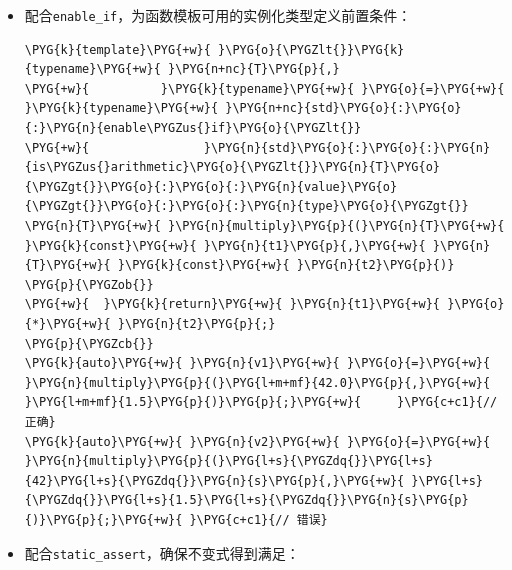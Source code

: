 \begin{itemize}
\item 配合\texttt{enable\_\allowbreak{}if}，为函数模板可用的实例化类型定义前置条件：



\begin{codeblockbg}
\begin{Verbatim}[commandchars=\\\{\},breaklines=true,breakanywhere=true,fontsize=\codefont,xleftmargin=17bp]
\PYG{k}{template}\PYG{+w}{ }\PYG{o}{\PYGZlt{}}\PYG{k}{typename}\PYG{+w}{ }\PYG{n+nc}{T}\PYG{p}{,}
\PYG{+w}{          }\PYG{k}{typename}\PYG{+w}{ }\PYG{o}{=}\PYG{+w}{ }\PYG{k}{typename}\PYG{+w}{ }\PYG{n+nc}{std}\PYG{o}{:}\PYG{o}{:}\PYG{n}{enable\PYGZus{}if}\PYG{o}{\PYGZlt{}}
\PYG{+w}{                }\PYG{n}{std}\PYG{o}{:}\PYG{o}{:}\PYG{n}{is\PYGZus{}arithmetic}\PYG{o}{\PYGZlt{}}\PYG{n}{T}\PYG{o}{\PYGZgt{}}\PYG{o}{:}\PYG{o}{:}\PYG{n}{value}\PYG{o}{\PYGZgt{}}\PYG{o}{:}\PYG{o}{:}\PYG{n}{type}\PYG{o}{\PYGZgt{}}
\PYG{n}{T}\PYG{+w}{ }\PYG{n}{multiply}\PYG{p}{(}\PYG{n}{T}\PYG{+w}{ }\PYG{k}{const}\PYG{+w}{ }\PYG{n}{t1}\PYG{p}{,}\PYG{+w}{ }\PYG{n}{T}\PYG{+w}{ }\PYG{k}{const}\PYG{+w}{ }\PYG{n}{t2}\PYG{p}{)}
\PYG{p}{\PYGZob{}}
\PYG{+w}{  }\PYG{k}{return}\PYG{+w}{ }\PYG{n}{t1}\PYG{+w}{ }\PYG{o}{*}\PYG{+w}{ }\PYG{n}{t2}\PYG{p}{;}
\PYG{p}{\PYGZcb{}}
\PYG{k}{auto}\PYG{+w}{ }\PYG{n}{v1}\PYG{+w}{ }\PYG{o}{=}\PYG{+w}{ }\PYG{n}{multiply}\PYG{p}{(}\PYG{l+m+mf}{42.0}\PYG{p}{,}\PYG{+w}{ }\PYG{l+m+mf}{1.5}\PYG{p}{)}\PYG{p}{;}\PYG{+w}{     }\PYG{c+c1}{// 正确}
\PYG{k}{auto}\PYG{+w}{ }\PYG{n}{v2}\PYG{+w}{ }\PYG{o}{=}\PYG{+w}{ }\PYG{n}{multiply}\PYG{p}{(}\PYG{l+s}{\PYGZdq{}}\PYG{l+s}{42}\PYG{l+s}{\PYGZdq{}}\PYG{n}{s}\PYG{p}{,}\PYG{+w}{ }\PYG{l+s}{\PYGZdq{}}\PYG{l+s}{1.5}\PYG{l+s}{\PYGZdq{}}\PYG{n}{s}\PYG{p}{)}\PYG{p}{;}\PYG{+w}{ }\PYG{c+c1}{// 错误}
\end{Verbatim}
\end{codeblockbg}



\item 配合\texttt{static\_\allowbreak{}assert}，确保不变式得到满足：




\end{itemize}
